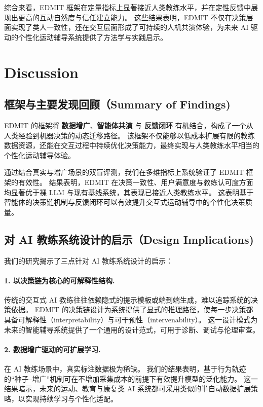 \documentclass[sigconf]{acmart}
\begin{document}
综合来看，\textsc{EDMIT} 框架在定量指标上显著接近人类教练水平，并在定性反馈中展现出更高的互动自然度与信任建立能力。
这些结果表明，\textsc{EDMIT} 不仅在决策层面实现了类人一致性，还在交互层面形成了可持续的人机共演体验，为未来 AI 驱动的个性化运动辅导系统提供了方法学与实践启示。

\section{Discussion}
\label{sec:discussion}

\subsection{框架与主要发现回顾（Summary of Findings)}

\textsc{EDMIT} 的框架将 \textbf{数据增广}、\textbf{智能体共演} 与 \textbf{反馈闭环} 有机结合，构成了一个从人类经验到机器决策的动态迁移路径。  
该框架不仅能够以低成本扩展有限的教练数据资源，还能在交互过程中持续优化决策能力，最终实现与人类教练水平相当的个性化运动辅导体验。

通过结合真实与增广场景的双盲评测，我们在多维指标上系统验证了 \textsc{EDMIT} 框架的有效性。  
结果表明，\textsc{EDMIT} 在决策一致性、用户满意度与教练认可度方面均显著优于裸 LLM 与现有基线系统，其表现已接近人类教练水平。  
这表明基于智能体的决策链机制与反馈闭环可以有效提升交互式运动辅导中的个性化决策质量。

\subsection{对 AI 教练系统设计的启示（Design Implications)}

我们的研究揭示了三点针对 AI 教练系统设计的启示：

\paragraph{1. 以决策链为核心的可解释性结构.}
传统的交互式 AI 教练往往依赖隐式的提示模板或端到端生成，难以追踪系统的决策依据。  
\textsc{EDMIT} 的决策链设计为系统提供了显式的推理路径，使每一步决策都具备可解释性（interpretability）与可干预性（intervenability）。  
这一设计模式为未来的智能辅导系统提供了一个通用的设计范式，可用于诊断、调试与伦理审查。

\paragraph{2. 数据增广驱动的可扩展学习.}
在 AI 教练场景中，真实标注数据极为稀缺。  
我们的结果表明，基于行为轨迹的“种子–增广”机制可在不增加采集成本的前提下有效提升模型的泛化能力。  
这一结果暗示，未来的运动、教育与康复类 AI 系统都可采用类似的半自动数据扩展策略，以实现持续学习与个性化适配。
\end{document}
